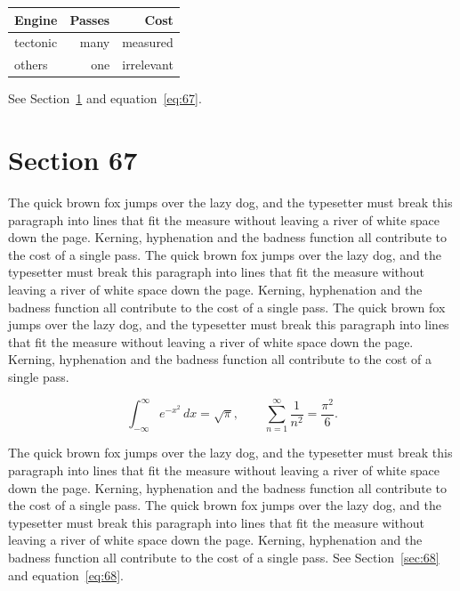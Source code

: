\documentclass{article}
\begin{document}
\begin{center}
\begin{tabular}{lrr}
\toprule
Engine & Passes & Cost \\
\midrule
tectonic & many & measured \\
others & one & irrelevant \\
\bottomrule
\end{tabular}
\end{center}

See Section~\ref{sec:67} and equation~\eqref{eq:67}.
\section{Section 67}
\label{sec:67}
The quick brown fox jumps over the lazy dog, and the typesetter must break this paragraph into lines that fit the measure without leaving a river of white space down the page. Kerning, hyphenation and the badness function all contribute to the cost of a single pass. The quick brown fox jumps over the lazy dog, and the typesetter must break this paragraph into lines that fit the measure without leaving a river of white space down the page. Kerning, hyphenation and the badness function all contribute to the cost of a single pass. The quick brown fox jumps over the lazy dog, and the typesetter must break this paragraph into lines that fit the measure without leaving a river of white space down the page. Kerning, hyphenation and the badness function all contribute to the cost of a single pass. 

\begin{equation}\label{eq:67}
\int_{-\infty}^{\infty} e^{-x^{2}}\,dx = \sqrt{\pi}, \qquad
\sum_{n=1}^{\infty} \frac{1}{n^{2}} = \frac{\pi^{2}}{6}.
\end{equation}

The quick brown fox jumps over the lazy dog, and the typesetter must break this paragraph into lines that fit the measure without leaving a river of white space down the page. Kerning, hyphenation and the badness function all contribute to the cost of a single pass. The quick brown fox jumps over the lazy dog, and the typesetter must break this paragraph into lines that fit the measure without leaving a river of white space down the page. Kerning, hyphenation and the badness function all contribute to the cost of a single pass. 
See Section~\ref{sec:68} and equation~\eqref{eq:68}.
\end{document}
